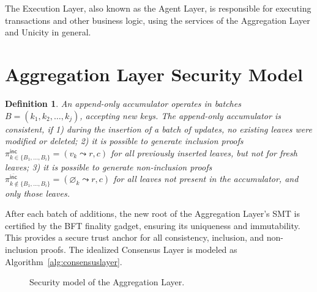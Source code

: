 \documentclass[twocolumn]{article}
\newtheorem{definition}{Definition}
\begin{document}
The Execution Layer, also known as the Agent Layer, is responsible for executing transactions and other business logic, using the services of the Aggregation Layer and Unicity in general.


\section{Aggregation Layer Security Model}

\begin{definition}
An append-only accumulator operates in batches $B = (k_1, k_2, \ldots, k_j)$, accepting new keys. The append-only accumulator is \emph{consistent}, if 1) during the insertion of a batch of updates, no existing leaves were modified or deleted; 2) it is possible to generate inclusion proofs $\pi^{\textsf{inc}}_{k \in \{B_1, \dots, B_i\}} = (v_k \leadsto r, c)$ for all previously inserted leaves, but not for \emph{fresh} leaves; 3) it is possible to generate non-inclusion proofs $\pi^{\overline{\textsf {inc}}}_{k \notin \{B_1, \dots, B_i\}} = (\varnothing_k \leadsto r, c)$ for all leaves not present in the accumulator, and only those leaves.
\label{def:append-only-accumulator}
\end{definition}



After each batch of additions, the new root of the Aggregation Layer's SMT is certified by the BFT finality gadget, ensuring its uniqueness and immutability. This provides a secure trust anchor for all consistency, inclusion, and non-inclusion proofs. The idealized Consensus Layer is modeled as Algorithm~\ref{alg:consensuslayer}.


\begin{figure}[!htbp]
    \centering
{}
    \caption{Security model of the Aggregation Layer.}\label{fig:model}
\end{figure}
\end{document}
